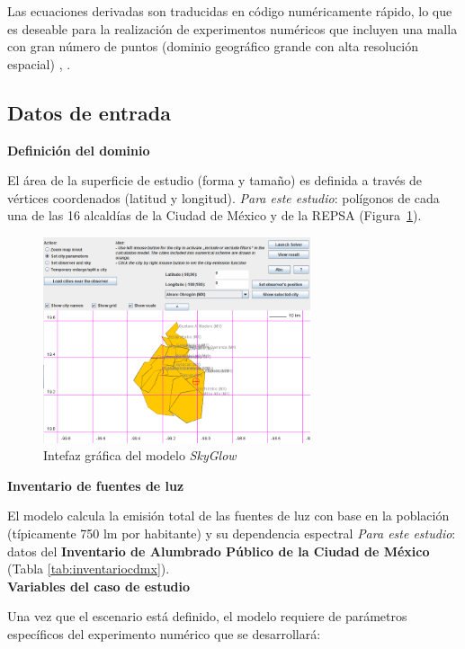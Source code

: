 Las ecuaciones derivadas son traducidas en código numéricamente rápido, lo que es deseable para la realización de experimentos numéricos que incluyen una malla con gran número de puntos (dominio geográfico grande con alta resolución espacial) \citep{Kocifaj2007}, \citep{Linares2018}.\\

\subsection{Datos de entrada}

\textbf{Definición del dominio}

El área de la superficie de estudio (forma y tamaño) es definida a través de vértices coordenados (latitud y longitud). \textit{Para este estudio}: polígonos de cada una de las 16 alcaldías de la Ciudad de México y de la REPSA (Figura~\ref{ciudaddemexicomodelo}).

\newpage

\begin{figure}
  \centering
    \includegraphics[width=0.7\textwidth]{ciudaddemexicomodelo}
  \caption{Intefaz gráfica del modelo \textit{SkyGlow}}
  \label{ciudaddemexicomodelo}
\end{figure}

\textbf{Inventario de fuentes de luz}

El modelo calcula la emisión total de las fuentes de luz con base en la población (típicamente 750 lm por habitante) y su dependencia espectral \textit{Para este estudio}: datos del \textbf{Inventario de Alumbrado Público de la Ciudad de México} (Tabla \ref{tab:inventariocdmx}).\\

\textbf{Variables del caso de estudio}

Una vez que el escenario está definido, el modelo requiere de parámetros específicos del experimento numérico que se desarrollará:

